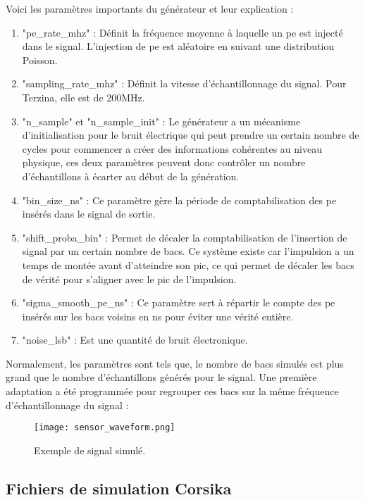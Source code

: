Voici les paramètres importants du générateur et leur explication :
\begin{enumerate}
    \item "pe\_rate\_mhz" : Définit la fréquence moyenne à laquelle un \gls{pe} est injecté dans le signal.
        L'injection de \gls{pe} est aléatoire en suivant une distribution Poisson.
    \item "sampling\_rate\_mhz" : Définit la vitesse d'échantillonnage du signal. Pour Terzina, elle est de 200MHz.
    \item "n\_sample" et "n\_sample\_init" : Le générateur a un mécanisme d'initialisation pour le bruit électrique 
        qui peut prendre un certain nombre de cycles pour commencer a créer des informations cohérentes au niveau physique, 
        ces deux paramètres peuvent donc contrôler un nombre d'échantillons à écarter au début de la génération.
    \item "bin\_size\_ns" : Ce paramètre gère la période de comptabilisation des \gls{pe} insérés dans le signal de sortie.
    \item "shift\_proba\_bin" : Permet de décaler la comptabilisation de l'insertion de signal par un certain nombre de bacs.
        Ce système existe car l'impulsion a un temps de montée avant d'atteindre son pic, ce qui permet de décaler les bacs 
        de vérité pour s'aligner avec le pic de l'impulsion.
    \item "sigma\_smooth\_pe\_ns" : Ce paramètre sert à répartir le compte des \gls{pe} insérés sur les bacs voisins en ns
        pour éviter une vérité entière. 
    \item "noise\_lsb" : Est une quantité de bruit électronique.
\end{enumerate}

Normalement, les paramètres sont tels que, le nombre de bacs simulés est plus grand que le nombre d'échantillons générés pour le signal.
Une première adaptation a été programmée pour regrouper ces bacs sur la même fréquence d'échantillonnage du signal :

\begin{figure}[tbph!]
	\centering
	\texttt{[image: sensor\_waveform.png]}
	\caption[Exemple de signal simulé]{Exemple de signal simulé.}
\end{figure}

\subsection{Fichiers de simulation Corsika}

